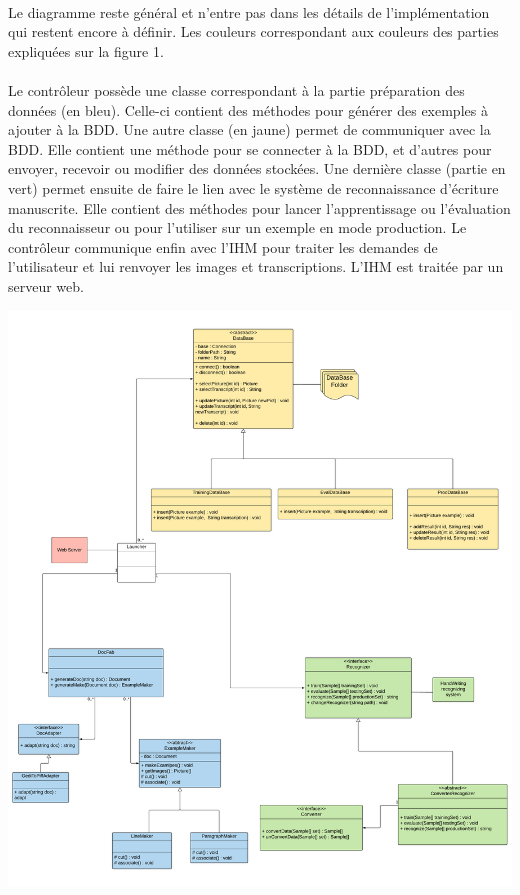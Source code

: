 \paragraph{}
Le diagramme reste général et n’entre pas dans les détails de l’implémentation
qui restent encore à définir. Les couleurs correspondant aux couleurs des
parties expliquées sur la figure 1.

\paragraph{}
Le contrôleur possède une classe correspondant à la partie préparation des
données (en bleu). Celle-ci contient des méthodes pour générer des exemples
à ajouter à la BDD. Une autre classe (en jaune) permet de communiquer avec
la BDD. Elle contient une méthode pour se connecter à la BDD, et d’autres pour
envoyer, recevoir ou modifier des données stockées. Une dernière classe
(partie en vert) permet ensuite de faire le lien avec le système de
reconnaissance d’écriture manuscrite. Elle contient des méthodes pour lancer
l’apprentissage ou l’évaluation du reconnaisseur ou pour l’utiliser sur un
exemple en mode production. Le contrôleur communique enfin avec l’IHM pour
traiter les demandes de l’utilisateur et lui renvoyer les images et
transcriptions. L’IHM est traitée par un serveur web.

\newpage

\begin{mdframed}[frametitle={Figure 16 : Diagramme de classes du contrôleur}, innerbottommargin=10]
\begin{center}
\includegraphics[scale=0.3]{Specifications.pdf}
\end{center}
\end{mdframed}
